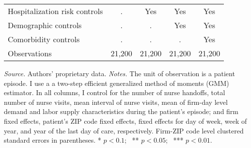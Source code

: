 \documentclass[final,12pt]{article}
\begin{document}
\begin{singlespace}
\begin{table}[H]
\begin{threeparttable}
\begin{tabular}{l*{4}{c}}
\midrule
Hospitalization risk controls & . & Yes & Yes & Yes \\
Demographic controls & . & . & Yes & Yes \\
 Comorbidity controls & . & . & . & Yes \\
Observations & 21,200 & 21,200 & 21,200 & 21,200 \\

\bottomrule
\end{tabular}
	\begin{tablenotes}
	\footnotesize
	\item \emph{Source.} Authors' proprietary data.
 \emph{Notes.}
	The unit of observation is a patient episode. I use a a two-step efficient generalized method of moments (GMM) estimator.
	In all columns, I control for
	the number of nurse handoffs, total number of nurse visits, mean interval of nurse visits, mean of firm-day level demand and labor supply characteristics during the patient's episode; and firm fixed effects, patient's ZIP code fixed effects, fixed effects for day of week, week of year, and year of the last day of care, respectively.
	Firm-ZIP code level clustered standard errors in parentheses.
	* $p< 0.1$; \ ** $p< 0.05$; \ *** $p < 0.01$.
	\end{tablenotes}
\end{threeparttable}
\end{table}



\end{singlespace}
\end{document}
